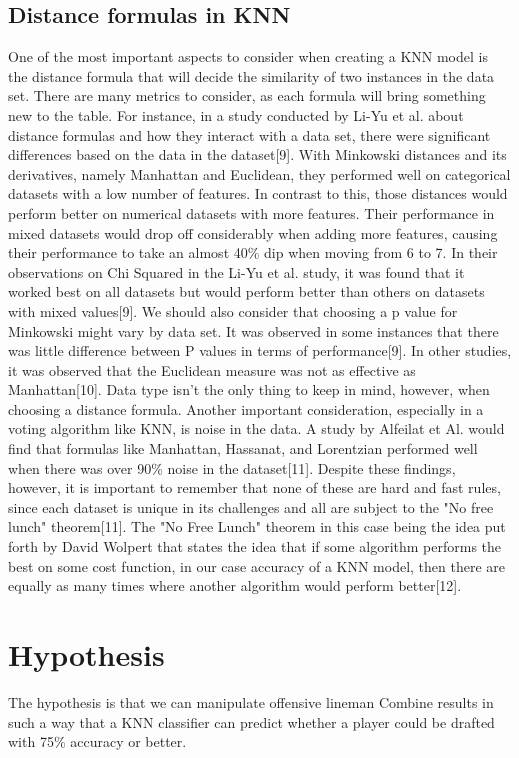 \documentclass[confrence]{IEEEtran}
\begin{document}
\subsection*{Distance formulas in KNN}
One of the most important aspects to consider when creating a KNN model is the distance formula that will decide the similarity of two instances in the data set.
There are many metrics to consider, as each formula will bring something new to the table. For instance, in a study conducted by Li-Yu et al. about distance formulas and how they interact with a data set, there were significant differences based on the data in the dataset[9].
With Minkowski distances and its derivatives, namely Manhattan and Euclidean, they performed well on categorical datasets with a low number of features.
In contrast to this, those distances would perform better on numerical datasets with more features.
Their performance in mixed datasets would drop off considerably when adding more features, causing their performance to take an almost 40\% dip when moving from 6 to 7.
In their observations on Chi Squared in the Li-Yu et al. study, it was found that it worked best on all datasets but would perform better than others on datasets with mixed values[9].
We should also consider that choosing a p value for Minkowski might vary by data set. It was observed in some instances that there was little difference between P values in terms of performance[9].
In other studies, it was observed that the Euclidean measure was not as effective as Manhattan[10]. Data type isn't the only thing to keep in mind, however, when choosing a distance formula.
Another important consideration, especially in a voting algorithm like KNN, is noise in the data. A study by Alfeilat et Al. would find that formulas like Manhattan, Hassanat, and Lorentzian performed well when there was over 90\% noise in the dataset[11].
Despite these findings, however, it is important to remember that none of these are hard and fast rules, since each dataset is unique in its challenges and all are subject to the "No free lunch" theorem[11].
The "No Free Lunch" theorem in this case being the idea put forth by David Wolpert that states the idea that if some algorithm performs the best on some cost function, in our case accuracy of a KNN model, then there are equally as many times where another algorithm would perform better[12].
\section*{Hypothesis}
The hypothesis is that we can manipulate offensive lineman Combine results in such a way that a KNN classifier can predict whether a player could be drafted with 75\% accuracy or better.
\end{document}

